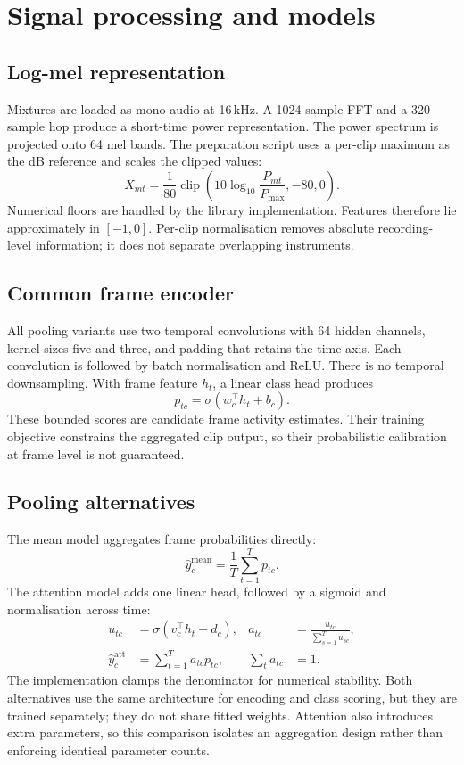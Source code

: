 \documentclass[10pt,a4paper]{article}
\begin{document}
\section{Signal processing and models}
\subsection{Log-mel representation}
Mixtures are loaded as mono audio at 16\,kHz. A 1024-sample FFT and a 320-sample hop produce a short-time power representation. The power spectrum is projected onto 64 mel bands. The preparation script uses a per-clip maximum as the dB reference and scales the clipped values:
\begin{equation}
X_{mt}=\frac{1}{80}\operatorname{clip}\left(10\log_{10}\frac{P_{mt}}{P_{\max}},-80,0\right).
\end{equation}
Numerical floors are handled by the library implementation. Features therefore lie approximately in $[-1,0]$. Per-clip normalisation removes absolute recording-level information; it does not separate overlapping instruments.

\subsection{Common frame encoder}
All pooling variants use two temporal convolutions with 64 hidden channels, kernel sizes five and three, and padding that retains the time axis. Each convolution is followed by batch normalisation and ReLU. There is no temporal downsampling. With frame feature $h_t$, a linear class head produces
\begin{equation}
p_{tc}=\sigma(w_c^\top h_t+b_c).
\end{equation}
These bounded scores are candidate frame activity estimates. Their training objective constrains the aggregated clip output, so their probabilistic calibration at frame level is not guaranteed.

\subsection{Pooling alternatives}
The mean model aggregates frame probabilities directly:
\begin{equation}
\widehat y^{\mathrm{mean}}_c=\frac{1}{T}\sum_{t=1}^{T}p_{tc}.
\end{equation}
The attention model adds one linear head, followed by a sigmoid and normalisation across time:
\begin{align}
u_{tc}&=\sigma(v_c^\top h_t+d_c), &
a_{tc}&=\frac{u_{tc}}{\sum_{s=1}^{T}u_{sc}},\\
\widehat y^{\mathrm{att}}_c&=\sum_{t=1}^{T}a_{tc}p_{tc}, &
\sum_t a_{tc}&=1.
\end{align}
The implementation clamps the denominator for numerical stability. Both alternatives use the same architecture for encoding and class scoring, but they are trained separately; they do not share fitted weights. Attention also introduces extra parameters, so this comparison isolates an aggregation design rather than enforcing identical parameter counts.
\end{document}
